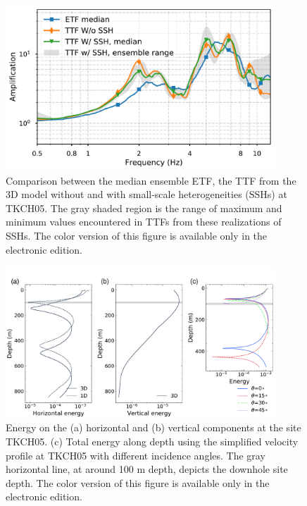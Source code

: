 \clearpage
\begin{figure}[!ht]
  \centering
  \includegraphics[width=0.9\textwidth]{figures/figure_etf_10.pdf}
  \caption{Comparison between the median ensemble ETF, the TTF from the 3D model without and with small-scale heterogeneities (SSHs) at TKCH05. The gray shaded region is the range of maximum and minimum values encountered in TTFs from these realizations of SSHs. The color version of this figure is available only in the electronic edition.}
  \label{fig:etf-10}
\end{figure}

\clearpage
\begin{figure}[!ht]
  \centering
  \includegraphics[width=0.9\textwidth]{figures/figure_etf_11.pdf}
  \caption{Energy on the (a) horizontal and (b) vertical components at the site TKCH05. (c) Total energy along depth using the simplified velocity profile at TKCH05 with different incidence angles. The gray horizontal line, at around 100 m depth, depicts the downhole site depth. The color version of this figure is available only in the electronic edition.}
  \label{fig:etf-11}
\end{figure}


\setcounter{table}{0}
\setcounter{figure}{0}
\renewcommand{\thetable}{A\arabic{chapter}.\arabic{table}}
\renewcommand{\thefigure}{A\arabic{chapter}.\arabic{figure}}
\newpage
